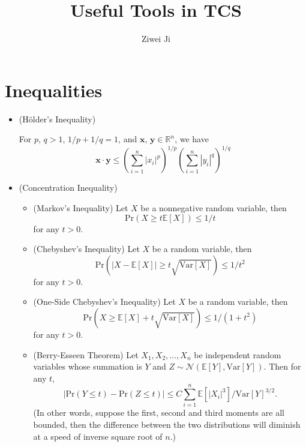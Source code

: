 \documentclass{article}
\title{Useful Tools in TCS}
\author{Ziwei Ji}
\begin{document}
\newcommand{\mr}[1]{\mathrm{#1}}
\newcommand{\mbb}[1]{\mathbb{#1}}
\newcommand{\mbf}[1]{\mathbf{#1}}

\maketitle

\section{Inequalities}

\begin{itemize}

\item (H\"older's Inequality) 

For $p$, $q>1$, $1/p+1/q=1$, and $\mathbf{x}$, $\mathbf{y}\in \mathbb{R}^n$, we have
\begin{equation}\label{holder}
\mathbf{x}\cdot\mathbf{y}\le(\sum_{i=1}^n|x_i|^p)^{1/p}(\sum_{i=1}^n|y_i|^q)^{1/q}
\end{equation}

\item (Concentration Inequality)

\begin{itemize}

\item (Markov's Inequality)  Let $X$ be a nonnegative random variable, then 
\begin{equation}
\mr{Pr}\left(X\ge t\mathbb{E}[X]\right)\le1/t
\end{equation}
for any $t>0$.

\item (Chebyshev's Inequality) Let $X$ be a random variable, then 
\begin{equation}
\mr{Pr}\left(\left|X-\mathbb{E}[X]\right|\ge t\sqrt{\mr{Var}[X]}\right)\le1/t^2
\end{equation}
for any $t>0$.

\item (One-Side Chebyshev's Inequality) Let $X$ be a random variable, then 
\begin{equation}
\mr{Pr}\left(X\ge\mbb{E}[X]+t\sqrt{\mr{Var}[X]}\right)\le1/(1+t^2)
\end{equation}
for any $t>0$.

\item (Berry-Esseen Theorem) Let $X_1,X_2,\ldots,X_n$ be independent random variables whose summation is $Y$ and $Z\sim\mathcal{N}(\mbb{E}[Y],\mr{Var}[Y])$. Then for any $t$, 
\begin{equation}
\left| \mr{Pr}(Y\le t)-\mr{Pr}(Z \le t) \right|\le C\sum_{i=1}^n\mbb{E}[|X_i|^3]/\mr{Var}[Y]^{3/2}.
\end{equation}
(In other words, suppose the first, second and third moments are all bounded, then the difference between the two distributions will diminish at a speed of inverse square root of $n$.)


\end{itemize}
\end{itemize}
\end{document}
